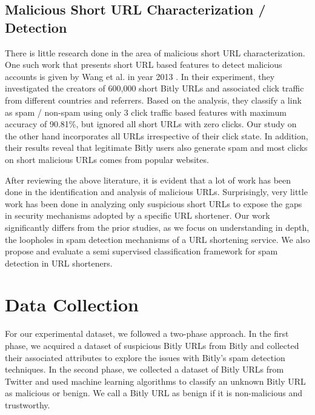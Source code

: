 \documentclass[conference]{IEEEtran}
\begin{document}
\subsection{Malicious Short URL Characterization / Detection}
\vspace{4pt}
There is little research done in the area of malicious short URL characterization. One such work that presents short URL based features to detect malicious accounts is given by Wang et al. in year 2013 \cite{12}. In their experiment, they investigated the creators of 600,000 short Bitly URLs and associated click traffic from different countries and referrers. Based on the analysis, they classify a link as spam / non-spam using only 3 click traffic based features with maximum accuracy of 90.81\%, but ignored all short URLs with zero clicks. Our study on the other hand incorporates all URLs irrespective of their click state. In addition, their results reveal that legitimate Bitly users also generate spam and most clicks on short malicious URLs comes from popular websites. 

After reviewing the above literature, it is evident that a lot of work has been done in the identification and analysis of malicious URLs. Surprisingly, very little work has been done in analyzing only suspicious short URLs to expose the gaps in security mechanisms adopted by a specific URL shortener. Our work significantly differs from the prior studies, as we focus on understanding in depth, the loopholes in spam detection mechanisms of a URL shortening service. We also propose and evaluate a semi supervised classification framework for spam detection in URL shorteners. 
\section{Data Collection}
\vspace{4pt}
For our experimental dataset, we followed a two-phase approach. In the first phase, we acquired a dataset of suspicious Bitly URLs from Bitly and collected their associated attributes to explore the issues with Bitly's spam detection techniques. In the second phase, we collected a dataset of Bitly URLs from Twitter and used machine learning algorithms to classify an unknown Bitly URL as malicious or benign. We call a Bitly URL as benign if it is non-malicious and trustworthy.
\end{document}
